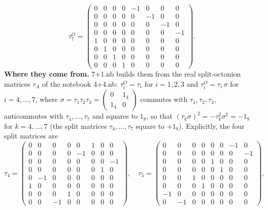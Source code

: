 \documentclass[10pt,a4paper]{article}
\begin{document}
\begin{equation*}
\tau^{O}_7=\begin{pmatrix}0 & 0 & 0 & 0 & -1 & 0 & 0 & 0 \\ 0 & 0 & 0 & 0 & 0 & -1 & 0 & 0 \\ 0 & 0 & 0 & 0 & 0 & 0 & -1 & 0 \\ 0 & 0 & 0 & 0 & 0 & 0 & 0 & -1 \\ 1 & 0 & 0 & 0 & 0 & 0 & 0 & 0 \\ 0 & 1 & 0 & 0 & 0 & 0 & 0 & 0 \\ 0 & 0 & 1 & 0 & 0 & 0 & 0 & 0 \\ 0 & 0 & 0 & 1 & 0 & 0 & 0 & 0\end{pmatrix}.
\end{equation*}
\textbf{Where they come from.} 7+1.nb builds them from the real split-octonion matrices $\tau_A$ of the notebook 4+4.nb: $\tau^{O}_i=\tau_i$ for $i=1,2,3$ and $\tau^{O}_i=\tau_i\,\sigma$ for $i=4,\dots,7$, where $\sigma=\tau_1\tau_2\tau_3=\left(\begin{smallmatrix}0&1_4\\1_4&0\end{smallmatrix}\right)$ commutes with $\tau_1,\tau_2,\tau_3$, anticommutes with $\tau_4,\dots,\tau_7$ and squares to $1_8$, so that $(\tau_k\sigma)^2=-\tau_k^2\sigma^2=-1_8$ for $k=4,\dots,7$ (the split matrices $\tau_4,\dots,\tau_7$ square to $+1_8$). Explicitly, the four split matrices are
\begin{equation*}
\tau_4=\begin{pmatrix}0 & 0 & 0 & 0 & 0 & 1 & 0 & 0 \\ 0 & 0 & 0 & 0 & -1 & 0 & 0 & 0 \\ 0 & 0 & 0 & 0 & 0 & 0 & 0 & -1 \\ 0 & 0 & 0 & 0 & 0 & 0 & 1 & 0 \\ 0 & -1 & 0 & 0 & 0 & 0 & 0 & 0 \\ 1 & 0 & 0 & 0 & 0 & 0 & 0 & 0 \\ 0 & 0 & 0 & 1 & 0 & 0 & 0 & 0 \\ 0 & 0 & -1 & 0 & 0 & 0 & 0 & 0\end{pmatrix},\quad \tau_5=\begin{pmatrix}0 & 0 & 0 & 0 & 0 & 0 & -1 & 0 \\ 0 & 0 & 0 & 0 & 0 & 0 & 0 & -1 \\ 0 & 0 & 0 & 0 & 1 & 0 & 0 & 0 \\ 0 & 0 & 0 & 0 & 0 & 1 & 0 & 0 \\ 0 & 0 & 1 & 0 & 0 & 0 & 0 & 0 \\ 0 & 0 & 0 & 1 & 0 & 0 & 0 & 0 \\ -1 & 0 & 0 & 0 & 0 & 0 & 0 & 0 \\ 0 & -1 & 0 & 0 & 0 & 0 & 0 & 0\end{pmatrix},
\end{equation*}
\end{document}
